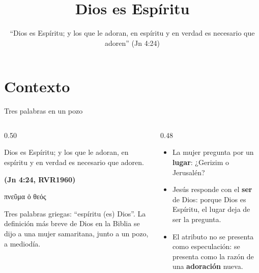 \documentclass[hyperref={bookmarks=false},aspectratio=169]{beamer}
\title[Dios es Espíritu]{\bfseries{Dios es Espíritu}}
\subtitle{``Dios es Espíritu; y los que le adoran, en espíritu y en verdad es necesario que adoren'' (Jn 4:24)}
\author{}\institute{}\date{}
\newcommand{\grc}[1]{\foreignlanguage{ancientgreek}{#1}}
\newcommand{\fuente}[1]{\par\hfill{\upshape\bfseries\footnotesize\textcolor{azul}{#1}}}
\newcommand{\destacar}[1]{\textbf{\textcolor{azul}{#1}}}
\begin{document}
\frame{\titlepage}


\section{Contexto}

\begin{frame}{Tres palabras en un pozo}
\begin{columns}[c,onlytextwidth]
\begin{column}{0.50\textwidth}
\begin{cita}Dios es Espíritu; y los que le adoran, en espíritu y en verdad es necesario que adoren.\fuente{(Jn 4:24, RVR1960)}\end{cita}
\begin{center}\grc{πνεῦμα ὁ θεός}\end{center}
\scriptsize Tres palabras griegas: ``espíritu (es) Dios''. La definición más breve de Dios en la Biblia se dijo a una mujer samaritana, junto a un pozo, a mediodía.
\end{column}
\begin{column}{0.48\textwidth}\small
\begin{itemize}
\item La mujer pregunta por un \destacar{lugar}: ¿Gerizim o Jerusalén?
\item Jesús responde con el \destacar{ser} de Dios: porque Dios es Espíritu, el lugar deja de ser la pregunta.
\item El atributo no se presenta como especulación: se presenta como la razón de una \destacar{adoración} nueva.
\end{itemize}
\end{column}
\end{columns}
\end{frame}
\end{document}

